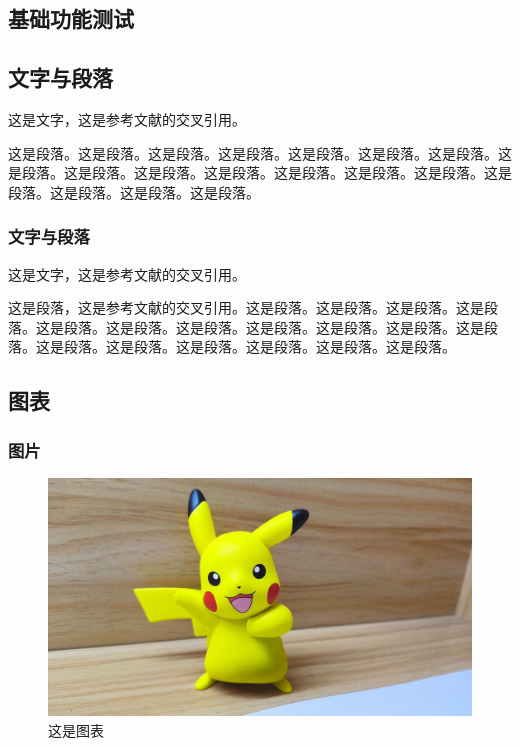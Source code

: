 \begin{ujnbody}
    \section{基础功能测试}
    \subsection{文字与段落}
    这是文字\cite{zh-book-8}，这是参考文献的交叉引用\cite{shannon1948mathematical}。

    这是段落。这是段落。这是段落。这是段落。这是段落。这是段落。这是段落。这是段落。这是段落。这是段落。这是段落。这是段落。这是段落。这是段落。这是段落。这是段落。这是段落。这是段落。
    \subsubsection{文字与段落}
    这是文字，这是参考文献的交叉引用\cite{nash1996non}。

    这是段落\cite{zh-book-9}，这是参考文献的交叉引用\cite{turing2009computing}。这是段落。这是段落。这是段落。这是段落。这是段落。这是段落。这是段落。这是段落。这是段落。这是段落。这是段落。这是段落。这是段落。这是段落。这是段落。这是段落。这是段落。
    \subsection{图表}

    \subsubsection{图片}

    \begin{figure}[htbp]
        \centering
        \includegraphics[scale=0.1, ]{figures/pikachu.jpg}
        \caption{这是图表}
    \end{figure}


\end{ujnbody}
